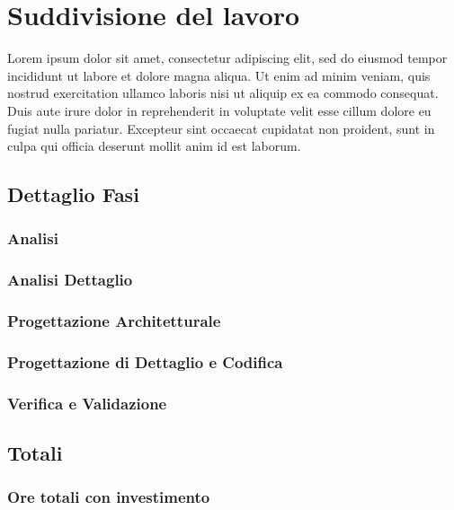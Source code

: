 \newpage
\section{Suddivisione del lavoro} \label{SuddivisioneDelLavoro}

	Lorem ipsum dolor sit amet, consectetur adipiscing elit, sed do eiusmod tempor incididunt ut labore et dolore magna aliqua. Ut enim ad minim veniam, quis nostrud exercitation ullamco laboris nisi ut aliquip ex ea commodo consequat. Duis aute irure dolor in reprehenderit in voluptate velit esse cillum dolore eu fugiat nulla pariatur. Excepteur sint occaecat cupidatat non proident, sunt in culpa qui officia deserunt mollit anim id est laborum.

	\subsection{Dettaglio Fasi}
		\subsubsection{Analisi}
		\subsubsection{Analisi Dettaglio}
		\subsubsection{Progettazione Architetturale}
		\subsubsection{Progettazione di Dettaglio e Codifica}
		\subsubsection{Verifica e Validazione}

	\subsection{Totali}
		\subsubsection{Ore totali con investimento}	